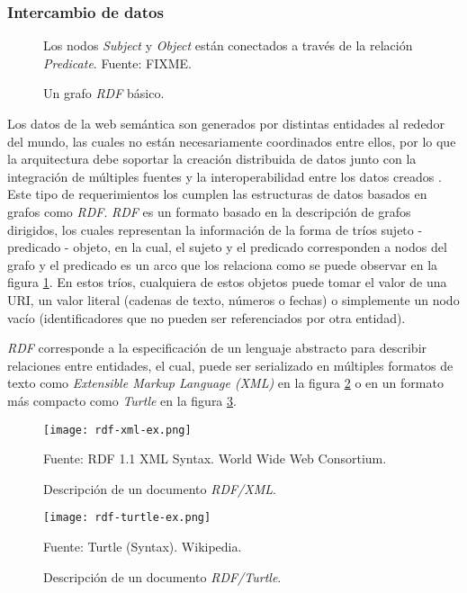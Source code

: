 \subsubsection{Intercambio de datos}
\label{sec:intercambio-datos}

\begin{figure}
    \centering
    
    \caption{Un grafo \textit{RDF} básico.} Los nodos \textit{Subject} y
    \textit{Object} están conectados a través de la relación \textit{Predicate}.
    Fuente: FIXME.
    \label{fig:rdf-graph1}
\end{figure}

Los datos de la web semántica son generados por distintas entidades al rededor
del mundo, las cuales no están necesariamente coordinados entre ellos, por lo
que la arquitectura debe soportar la creación distribuida de datos junto con la
integración de múltiples fuentes y la interoperabilidad entre los datos creados
\cite{bizer2011linked}. Este tipo de requerimientos los cumplen las estructuras
de datos basados en grafos como \textit{RDF}. \textit{RDF} es un formato basado
en la descripción de grafos dirigidos, los cuales representan la información de
la forma de tríos sujeto - predicado - objeto, en la cual, el sujeto y el
predicado corresponden a nodos del grafo y el predicado es un arco que los
relaciona como se puede observar en la figura \ref{fig:rdf-graph1}. En estos
tríos, cualquiera de estos objetos puede tomar el valor de una URI, un valor
literal (cadenas de texto, números o fechas) o simplemente un nodo vacío
(identificadores que no pueden ser referenciados por otra entidad).

\textit{RDF} corresponde a la especificación de un lenguaje abstracto para
describir relaciones entre entidades, el cual, puede ser serializado en
múltiples formatos de texto como \textit{Extensible Markup Language (XML)}
\cite{beckett2004rdf} en la figura \ref{fig:rdf-xml-ex} o en un formato más
compacto como \textit{Turtle} \cite{beckett2014rdf} en la figura
\ref{fig:rdf-turtle-ex}.

\begin{figure}
    \centering
    \texttt{[image: rdf-xml-ex.png]}
    \caption{Descripción de un documento \textit{RDF/XML}.} Fuente: RDF 1.1 XML
    Syntax. World Wide Web Consortium.
    \label{fig:rdf-xml-ex}
\end{figure}

\begin{figure}
    \centering
    \texttt{[image: rdf-turtle-ex.png]}
    \caption{Descripción de un documento \textit{RDF/Turtle}.} Fuente: Turtle
    (Syntax). Wikipedia.
    \label{fig:rdf-turtle-ex}
\end{figure}

